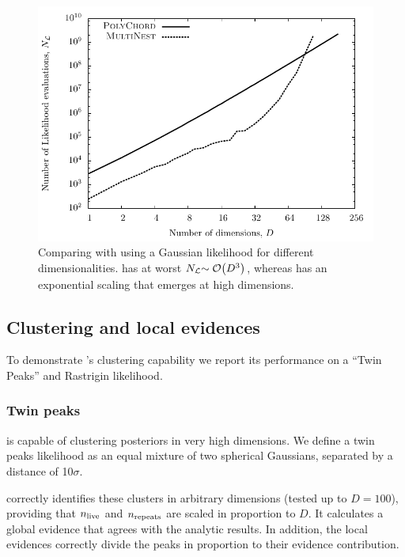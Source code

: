 \begin{figure}[tp]
  \centering
  \includegraphics[width=\columnwidth]{chapter_polychord/figures/gaussian}
  \caption{Comparing \PolyChord{} with \MultiNest{} using a
  Gaussian likelihood for different dimensionalities. \PolyChord{} has at worst $N_{\mathcal{L}}{\sim\mathcal{O}{\left(D^3\right)}}$, whereas \MultiNest{} has an exponential scaling that emerges at high dimensions.\label{fig:pc:gaussian}
}
\end{figure}

\subsection{Clustering and local evidences}
\label{sec:pc:loc_ev}
To demonstrate \PolyChord{}'s clustering capability we report its performance on a ``Twin Peaks'' and Rastrigin likelihood.

\subsubsection{Twin peaks}
\label{sec:pc:twin_peaks}
\PolyChord{} is capable of clustering posteriors in very high dimensions. We define a twin peaks likelihood as an equal mixture of two spherical Gaussians, separated by a distance of 10$\sigma$.

\PolyChord{} correctly identifies these clusters in arbitrary dimensions (tested up to $D=100$), providing that $n_{\mathrm{live}}$ and $n_{\mathrm{repeats}}$ are scaled in proportion to $D$. It calculates a global evidence that agrees with the analytic results. In addition, the local evidences correctly divide the peaks in proportion to their evidence contribution.

